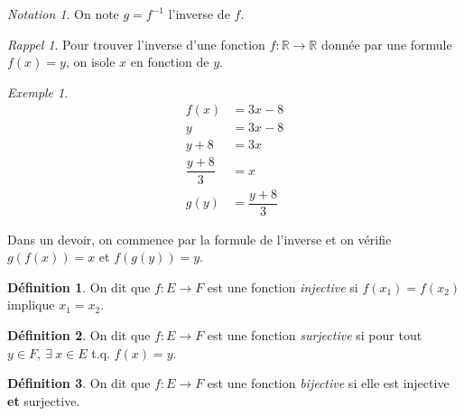 \documentclass{report}
\newcommand*{\reels}{\mathbb{R}}
\theoremstyle{definition}
\newtheorem*{defin}{D\'efinition}
\theoremstyle{remark}
\newtheorem*{exem}{Exemple}
\newtheorem*{nota}{Notation}
\newtheorem*{rappel}{Rappel}
\begin{document}
	\begin{nota}
		On note $g=f^{-1}$ l'inverse de $f$.
	\end{nota}


	\begin{rappel}
		Pour trouver l'inverse d'une fonction $f:\reels \to \reels$ donn\'ee par une formule $f(x)=y$, on isole $x$ en fonction de $y$.
	\end{rappel}


	\begin{exem}
		\begin{align*}
			f(x)&= 3x-8\\
			y&= 3x-8\\
			y+8&= 3x\\
			\dfrac{y+8}{3}&= x\\
			g(y)&= \dfrac{y+8}{3}
		\end{align*}

		Dans un devoir, on commence par la formule de l'inverse et on v\'erifie $g(f(x))=x$ et $f(g(y))=y$.
	\end{exem}

	\begin{defin}
		On dit que $f:E \to F$ est une fonction \emph{injective} si $f(x_1)=f(x_2)$ implique $x_1=x_2$.
	\end{defin}

	\begin{defin}
		On dit que $f:E \to F$ est une fonction \emph{surjective} si pour tout $y \in F,~\exists~x \in E$ t.q. $f(x)=y$.
	\end{defin}

	\begin{defin}
		On dit que $f:E \to F$ est une fonction \emph{bijective} si elle est injective \textbf{et} surjective.
	\end{defin}
\end{document}
